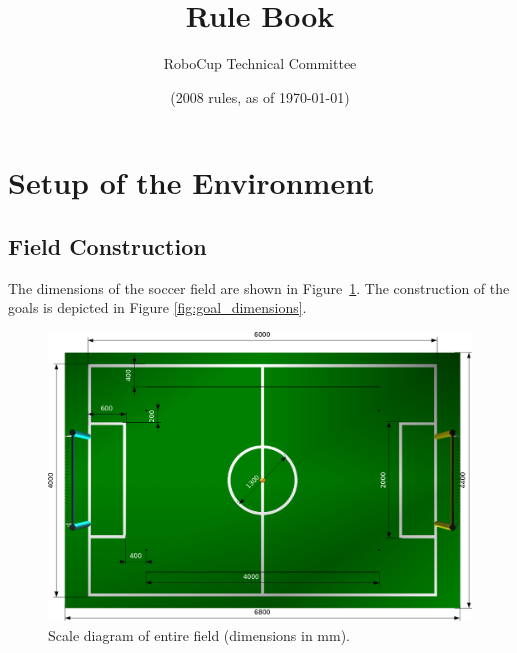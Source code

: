 \documentclass[12pt]{article}
\title{\leaguename Rule Book}
\author{RoboCup Technical Committee}
\date{(2008 rules, as of \today)}
\begin{document}
\maketitle

\vfill

\tableofcontents
\setcounter{tocdepth}{3}

\thispagestyle{fancy}

\clearpage

\cfoot{\thepage}
\setcounter{page}{1}

\section{Setup of the Environment}

\subsection{Field Construction}

The dimensions of the soccer field are shown in
Figure~\ref{fig:field_dim}. The construction of the goals is depicted in Figure \ref{fig:goal_dimensions}.

\begin{figure}[b!]
\centerline{\includegraphics[width=\columnwidth]{figs/Nao2008FieldDimensions.png}}
\caption{Scale diagram of entire field (dimensions in mm).} \label{fig:field_dim}
\end{figure}


\end{document}
